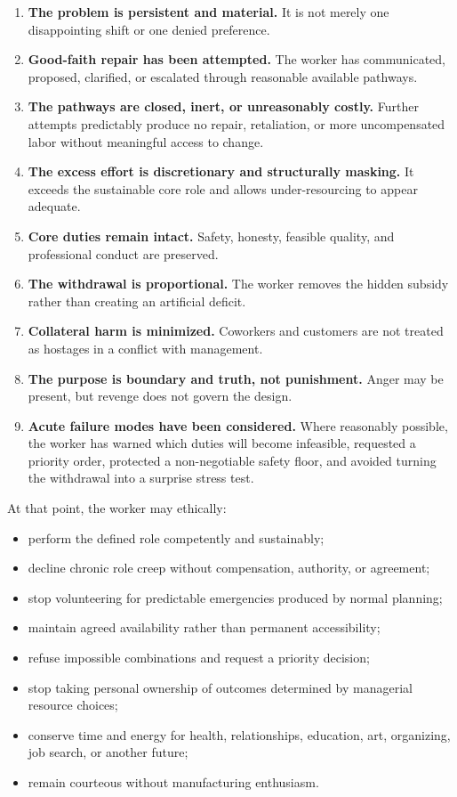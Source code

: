 \documentclass[11pt,oneside]{article}
\providecommand{\tightlist}{%
  \setlength{\itemsep}{0.22em}\setlength{\parskip}{0pt}}
\begin{document}
\begin{enumerate}
\def\labelenumi{\arabic{enumi}.}
\tightlist
\item
  \textbf{The problem is persistent and material.} It is not merely one
  disappointing shift or one denied preference.
\item
  \textbf{Good-faith repair has been attempted.} The worker has
  communicated, proposed, clarified, or escalated through reasonable
  available pathways.
\item
  \textbf{The pathways are closed, inert, or unreasonably costly.}
  Further attempts predictably produce no repair, retaliation, or more
  uncompensated labor without meaningful access to change.
\item
  \textbf{The excess effort is discretionary and structurally masking.}
  It exceeds the sustainable core role and allows under-resourcing to
  appear adequate.
\item
  \textbf{Core duties remain intact.} Safety, honesty, feasible quality,
  and professional conduct are preserved.
\item
  \textbf{The withdrawal is proportional.} The worker removes the hidden
  subsidy rather than creating an artificial deficit.
\item
  \textbf{Collateral harm is minimized.} Coworkers and customers are not
  treated as hostages in a conflict with management.
\item
  \textbf{The purpose is boundary and truth, not punishment.} Anger may
  be present, but revenge does not govern the design.
\item
  \textbf{Acute failure modes have been considered.} Where reasonably
  possible, the worker has warned which duties will become infeasible,
  requested a priority order, protected a non-negotiable safety floor,
  and avoided turning the withdrawal into a surprise stress test.
\end{enumerate}

At that point, the worker may ethically:

\begin{itemize}
\tightlist
\item
  perform the defined role competently and sustainably;
\item
  decline chronic role creep without compensation, authority, or
  agreement;
\item
  stop volunteering for predictable emergencies produced by normal
  planning;
\item
  maintain agreed availability rather than permanent accessibility;
\item
  refuse impossible combinations and request a priority decision;
\item
  stop taking personal ownership of outcomes determined by managerial
  resource choices;
\item
  conserve time and energy for health, relationships, education, art,
  organizing, job search, or another future;
\item
  remain courteous without manufacturing enthusiasm.
\end{itemize}
\end{document}
